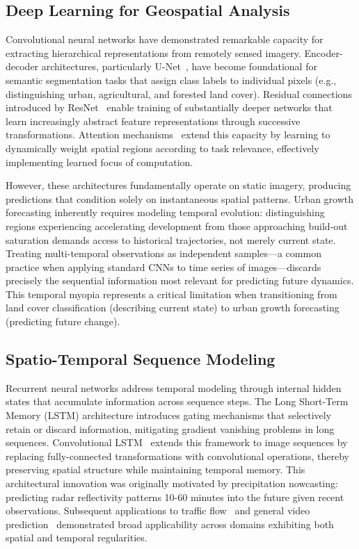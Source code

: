 \documentclass[conference]{IEEEtran}
\begin{document}
\subsection{Deep Learning for Geospatial Analysis}
Convolutional neural networks have demonstrated remarkable capacity for extracting hierarchical representations from remotely sensed imagery. Encoder-decoder architectures, particularly U-Net~\cite{ronneberger2015}, have become foundational for semantic segmentation tasks that assign class labels to individual pixels (e.g., distinguishing urban, agricultural, and forested land cover). Residual connections introduced by ResNet~\cite{he2016} enable training of substantially deeper networks that learn increasingly abstract feature representations through successive transformations. Attention mechanisms~\cite{vaswani2017} extend this capacity by learning to dynamically weight spatial regions according to task relevance, effectively implementing learned focus of computation.

However, these architectures fundamentally operate on static imagery, producing predictions that condition solely on instantaneous spatial patterns. Urban growth forecasting inherently requires modeling temporal evolution: distinguishing regions experiencing accelerating development from those approaching build-out saturation demands access to historical trajectories, not merely current state. Treating multi-temporal observations as independent samples---a common practice when applying standard CNNs to time series of images---discards precisely the sequential information most relevant for predicting future dynamics. This temporal myopia represents a critical limitation when transitioning from land cover classification (describing current state) to urban growth forecasting (predicting future change).

\subsection{Spatio-Temporal Sequence Modeling}
Recurrent neural networks address temporal modeling through internal hidden states that accumulate information across sequence steps. The Long Short-Term Memory (LSTM) architecture introduces gating mechanisms that selectively retain or discard information, mitigating gradient vanishing problems in long sequences. Convolutional LSTM~\cite{shi2015} extends this framework to image sequences by replacing fully-connected transformations with convolutional operations, thereby preserving spatial structure while maintaining temporal memory. This architectural innovation was originally motivated by precipitation nowcasting: predicting radar reflectivity patterns 10-60 minutes into the future given recent observations. Subsequent applications to traffic flow~\cite{zhang2018} and general video prediction~\cite{wang2017} demonstrated broad applicability across domains exhibiting both spatial and temporal regularities.
\end{document}
